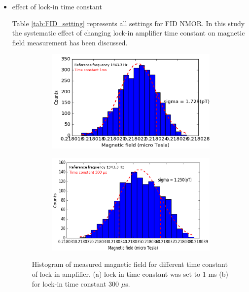 
 \begin{itemize}
   \item effect of lock-in time constant
   
  Table \ref{tab:FID_setting} represents all settings for FID NMOR. In this study the systematic effect of changing lock-in amplifier time constant on magnetic field measurement has been discussed.
   \begin{figure}
    \centering
    \begin{subfigure}[b]{0.45\textwidth}
        \centering
        \includegraphics[width=\textwidth]{figures/time_constant}
        \caption{}
        \label{fig:time constant long}
    \end{subfigure}
    \hfill
    \begin{subfigure}[b]{0.45\textwidth}
        \centering
        \includegraphics[width=\textwidth]{figures/time_constant_300micro_sec}
        \caption{}
        \label{fig:time constant short}
    \end{subfigure}
    \caption{Histogram of measured magnetic field for different time constant of lock-in amplifier. (a) lock-in time constant was set to 1 ms (b) for lock-in time constant 300 $\mu$s. \label{fig:different time constant} }
\end{figure}
  

\end{itemize}

